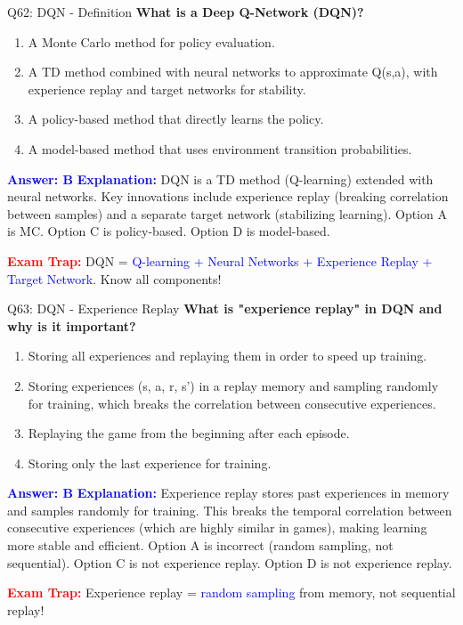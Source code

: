 \documentclass[8pt]{beamer}
\begin{document}
	\begin{frame}{Q62: DQN - Definition}
		\fontsize{6.5}{7.5}\selectfont
		\textbf{What is a Deep Q-Network (DQN)?}
		
		\begin{enumerate}
			\item A Monte Carlo method for policy evaluation.
			\item A TD method combined with neural networks to approximate Q(s,a), with experience replay and target networks for stability.
			\item A policy-based method that directly learns the policy.
			\item A model-based method that uses environment transition probabilities.
		\end{enumerate}
		
		\vspace{0.1cm}
		\textcolor{blue}{\textbf{Answer: B}}
		\vspace{0.1cm}
		\textcolor{blue}{\textbf{Explanation:}} DQN is a TD method (Q-learning) extended with neural networks. Key innovations include experience replay (breaking correlation between samples) and a separate target network (stabilizing learning). Option A is MC. Option C is policy-based. Option D is model-based.
		
		\textcolor{red}{\textbf{Exam Trap:}} DQN = \textcolor{blue}{Q-learning + Neural Networks + Experience Replay + Target Network}. Know all components!
	\end{frame}
	
	\begin{frame}{Q63: DQN - Experience Replay}
		\fontsize{6.5}{7.5}\selectfont
		\textbf{What is "experience replay" in DQN and why is it important?}
		
		\begin{enumerate}
			\item Storing all experiences and replaying them in order to speed up training.
			\item Storing experiences (s, a, r, s') in a replay memory and sampling randomly for training, which breaks the correlation between consecutive experiences.
			\item Replaying the game from the beginning after each episode.
			\item Storing only the last experience for training.
		\end{enumerate}
		
		\vspace{0.1cm}
		\textcolor{blue}{\textbf{Answer: B}}
		\vspace{0.1cm}
		\textcolor{blue}{\textbf{Explanation:}} Experience replay stores past experiences in memory and samples randomly for training. This breaks the temporal correlation between consecutive experiences (which are highly similar in games), making learning more stable and efficient. Option A is incorrect (random sampling, not sequential). Option C is not experience replay. Option D is not experience replay.
		
		\textcolor{red}{\textbf{Exam Trap:}} Experience replay = \textcolor{blue}{random sampling} from memory, not sequential replay!
	\end{frame}
	
\end{document}
